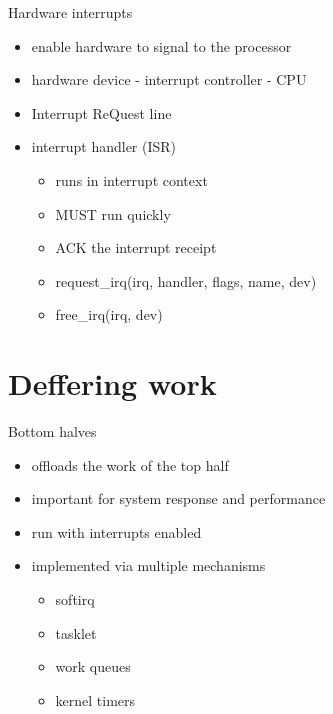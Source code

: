 \documentclass{workshop}
\begin{document}
\begin{frame}{Hardware interrupts}
\begin{itemize}
\item enable hardware to signal to the processor
\item hardware device - interrupt controller - CPU
\item Interrupt ReQuest line
\item interrupt handler (ISR)
\begin{itemize}
\item runs in interrupt context
\item MUST run quickly
\item ACK the interrupt receipt
\item request_irq(irq, handler, flags, name, dev)
\item free_irq(irq, dev)
\end{itemize}
\end{itemize} 
\end{frame}

\section{Deffering work}
\begin{frame}{Bottom halves}
\begin{itemize}
\item offloads the work of the top half
\item important for system response and performance
\item run with interrupts enabled
\item implemented via multiple mechanisms
\begin{itemize}
\item softirq
\item tasklet
\item work queues
\item kernel timers
\end{itemize}
\end{itemize}
\end{frame}
\end{document}
